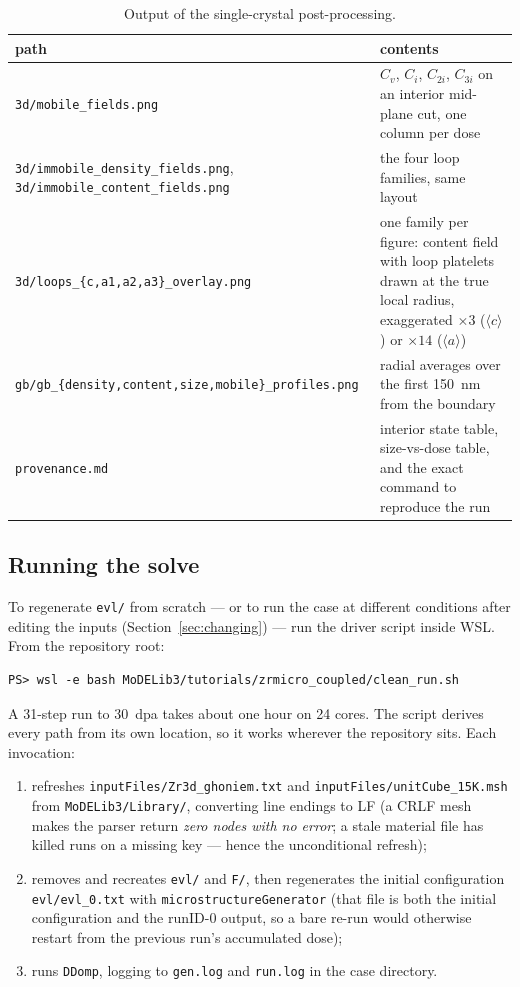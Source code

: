 \documentclass[11pt]{article}
\newcommand{\aloop}{\ensuremath{\langle a\rangle}}
\newcommand{\cloop}{\ensuremath{\langle c\rangle}}
\newcommand{\code}[1]{\texttt{\small #1}}
\newcommand{\file}[1]{\texttt{\footnotesize #1}}
\begin{document}
\begin{table}[htbp]
\centering
\caption{Output of the single-crystal post-processing.}
\label{tab:firstout}
\begin{tabular}{@{}p{}p{}@{}}
\toprule
path & contents \\
\midrule
\file{3d/mobile\_fields.png} & $C_v$, $C_i$, $C_{2i}$, $C_{3i}$ on an
interior mid-plane cut, one column per dose \\
\file{3d/immobile\_density\_fields.png},
\file{3d/immobile\_content\_fields.png} & the four loop families, same
layout \\
\file{3d/loops\_\{c,a1,a2,a3\}\_overlay.png} & one family per figure:
content field with loop platelets drawn at the true local radius, exaggerated
$\times 3$ (\cloop) or $\times 14$ (\aloop) \\
\file{gb/\allowbreak gb\_\{density,content,size,\allowbreak mobile\}\_profiles.png} & radial
averages over the first 150~nm from the boundary \\
\file{provenance.md} & interior state table, size-vs-dose table, and the
exact command to reproduce the run \\
\bottomrule
\end{tabular}
\end{table}

\subsection{Running the solve}
\label{sec:cleanrun}

To regenerate \file{evl/} from scratch --- or to run the case at different
conditions after editing the inputs (Section~\ref{sec:changing}) --- run the
driver script inside WSL. From the repository root:

\begin{lstlisting}[style=ps]
PS> wsl -e bash MoDELib3/tutorials/zrmicro_coupled/clean_run.sh
\end{lstlisting}

A 31-step run to 30~dpa takes about one hour on 24 cores. The script derives
every path from its own location, so it works wherever the repository sits.
Each invocation:

\begin{enumerate}
\item refreshes \file{inputFiles/Zr3d\_ghoniem.txt} and
\file{inputFiles/unitCube\_15K.msh} from \file{MoDELib3/Library/}, converting
line endings to LF (a CRLF mesh makes the parser return \emph{zero nodes with
no error}; a stale material file has killed runs on a missing key --- hence
the unconditional refresh);
\item removes and recreates \file{evl/} and \file{F/}, then regenerates the
initial configuration \file{evl/evl\_0.txt} with
\code{microstructureGenerator} (that file is both the initial configuration
and the runID-0 output, so a bare re-run would otherwise restart from the
previous run's accumulated dose);
\item runs \code{DDomp}, logging to \file{gen.log} and \file{run.log} in the
case directory.
\end{enumerate}
\end{document}
